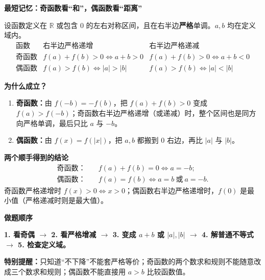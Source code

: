 \clearpage
\begin{summarybox}
\textbf{\textcolor{CSummary}{最短记忆：奇函数看“和”，偶函数看“距离”}}

设函数定义在 $\mathbb R$ 或包含 $0$ 的左右对称区间，且在右半边\textbf{严格}单调。$a,b$ 均在定义域内。
\[
\begin{array}{c|c|c}
\text{函数}&\text{右半边严格递增}&\text{右半边严格递减}\\\hline
\text{奇函数}&f(a)+f(b)>0\iff a+b>0&f(a)+f(b)>0\iff a+b<0\\[2pt]
\text{偶函数}&f(a)>f(b)\iff|a|>|b|&f(a)>f(b)\iff|a|<|b|
\end{array}
\]

\textbf{\textcolor{CSummary}{为什么成立？}}
\begin{enumerate}[leftmargin=*,itemsep=0.35em]
  \item \textbf{奇函数：}由 $f(-b)=-f(b)$，把 $f(a)+f(b)>0$ 变成 $f(a)>f(-b)$；奇函数右半边严格递增（或递减）时，整个区间也是同方向严格单调，最后只比 $a$ 与 $-b$。
  \item \textbf{偶函数：}由 $f(x)=f(|x|)$，把 $a,b$ 都搬到 $0$ 右边，再比 $|a|$ 与 $|b|$。
\end{enumerate}

\textbf{\textcolor{CSummary}{两个顺手得到的结论}}
\[
\begin{aligned}
\text{奇函数：}\quad&f(a)+f(b)=0\iff a=-b;\\
\text{偶函数：}\quad&f(a)=f(b)\iff a=b\ \text{或}\ a=-b.
\end{aligned}
\]
奇函数严格递增时 $f(x)>0\iff x>0$；偶函数右半边严格递增时，$f(0)$ 是最小值（严格递减时则是最大值）。

\medskip
\textbf{\textcolor{CSummary}{做题顺序}}

\textbf{1. 看奇偶 $\rightarrow$ 2. 看严格增减 $\rightarrow$ 3. 变成 $a+b$ 或 $|a|,|b|$ $\rightarrow$ 4. 解普通不等式 $\rightarrow$ 5. 检查定义域。}

\textbf{\textcolor{CSummary}{特别提醒：}}只知道“不下降”不能套严格等价；奇函数的两个数求和规则不能随意改成三个数求和规则；偶函数不能直接用 $a>b$ 比较函数值。
\end{summarybox}
